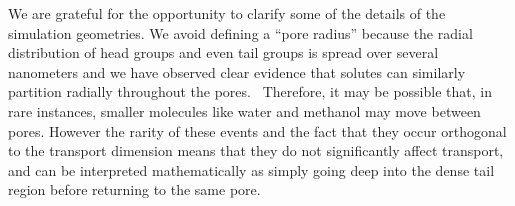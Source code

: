 \documentclass{article}
\begin{document}
\begin{enumerate}[label={Comment \theenumi :}, leftmargin=3.9\parindent]


    We are grateful for the opportunity to clarify some of the details of the simulation 
    geometries. We avoid defining a ``pore radius'' because the radial distribution of 
    head groups and even tail groups is spread over several nanometers and we have
    observed clear evidence that solutes can similarly partition radially throughout 
    the pores.~\cite{coscia_understanding_2019,coscia_chemically_2019} 
    Therefore, it may be possible that, in rare instances, smaller molecules like water and
    methanol may move between pores. However the rarity of these events and the fact that 
    they occur orthogonal to the transport dimension means that they do not significantly 
    affect transport, and can be interpreted mathematically as simply going deep into the 
    dense tail region before returning to the same pore.
    

\end{enumerate}
\end{document}
